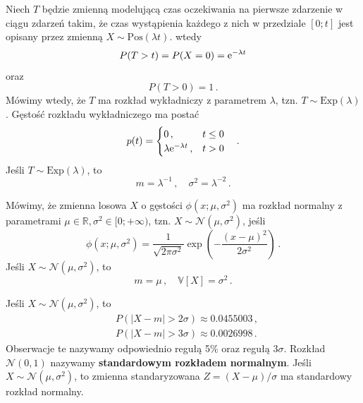 \documentclass{myclass}
\numberwithin{equation}{section}
\begin{document}
\begin{definition}
Niech \(T\) będzie zmienną modelującą czas oczekiwania na pierwsze zdarzenie w ciągu zdarzeń takim,
że czas wystąpienia każdego z nich w przedziale \([0;t]\) jest opisany przez zmienną \(X \sim
\mathrm{Pos}(\lambda t)\). wtedy
\begin{equation*}
    P(T > t) = P(X = 0) = \mathrm{e}^{-\lambda t}
\end{equation*}
oraz
\begin{equation*}
    P(T > 0) = 1\,.
\end{equation*}
Mówimy wtedy, że \(T\) ma rozkład wykładniczy z parametrem \(\lambda\), tzn. \(T \sim
\mathrm{Exp}(\lambda)\). Gęstość rozkładu wykładniczego ma postać
\begin{equation*}
    p(t) = \begin{cases}
        0\,,&t \leq 0\\
        \lambda \mathrm{e}^{-\lambda t}\,,&t > 0
    \end{cases}\quad.
\end{equation*}
Jeśli \(T \sim \mathrm{Exp}(\lambda)\), to
\begin{equation*}
    m = \lambda^{-1}\,,\quad \sigma^2 = \lambda^{-2}\,.
\end{equation*}
\end{definition}

\begin{definition}
Mówimy, że zmienna losowa \(X\) o gęstości \(\phi(x;\mu,\sigma^2)\) ma rozkład normalny z
parametrami \(\mu \in \mathbb{R} , \sigma^2 \in [0;+\infty)\), tzn. \(X \sim
\mathcal{N}(\mu,\sigma^2)\), jeśli    
\begin{equation*}
    \phi(x; \mu, \sigma^2) = \frac{1}{\sqrt{2 \pi \sigma^2}} \exp\left(-\frac{(x-\mu)^2}{2\sigma^2}\right)\,.
\end{equation*}
Jeśli \(X \sim \mathcal{N}(\mu,\sigma^2)\), to
\begin{equation*}
    m = \mu\,,\quad \mathbb{V}[X] = \sigma^2\,.
\end{equation*}
\end{definition}

Jeśli \(X \sim \mathcal{N}(\mu,\sigma^2)\), to
\begin{equation}
    \begin{split}        
        &P(|X - m| > 2\sigma) \approx 0.0455003\,,\\
        &P(|X - m| > 3\sigma) \approx 0.0026998\,.
    \end{split}
\end{equation}
Obserwacje te nazywamy odpowiednio regułą 5\% oraz regułą \(3\sigma\). Rozkład \(\mathcal{N}(0,1)\)
nazywamy \textbf{standardowym rozkładem normalnym}. Jeśli \(X \sim \mathcal{N}(\mu,\sigma^2)\),
to zmienna standaryzowana \(Z = (X - \mu) / \sigma\) ma standardowy rozkład normalny.
\end{document}

